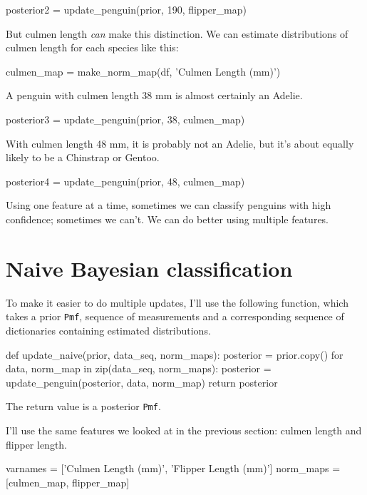 \documentclass[12pt]{book}
\theoremstyle{exercise}
\newcommand{\py}[1]{{\tt #1}}%
\begin{document}
\begin{code}
posterior2 = update_penguin(prior, 190, flipper_map)
\end{code}

But culmen length \emph{can} make this distinction. We can estimate
distributions of culmen length for each species like this:

\begin{code}
culmen_map = make_norm_map(df, 'Culmen Length (mm)')
\end{code}

A penguin with culmen length 38 mm is almost certainly an Adelie.

\begin{code}
posterior3 = update_penguin(prior, 38, culmen_map)
\end{code}

With culmen length 48 mm, it is probably not an Adelie, but it's about
equally likely to be a Chinstrap or Gentoo.

\begin{code}
posterior4 = update_penguin(prior, 48, culmen_map)
\end{code}

Using one feature at a time, sometimes we can classify penguins with
high confidence; sometimes we can't. We can do better using multiple
features.

\section{Naive Bayesian classification}
\label{naive-bayesian-classification}

To make it easier to do multiple updates, I'll use the following
function, which takes a prior \py{Pmf}, sequence of
measurements and a corresponding sequence of dictionaries containing
estimated distributions.

\begin{code}
def update_naive(prior, data_seq, norm_maps):
    posterior = prior.copy()
    for data, norm_map in zip(data_seq, norm_maps):
        posterior = update_penguin(posterior, data, norm_map)
    return posterior
\end{code}

The return value is a posterior \py{Pmf}.

I'll use the same features we looked at in the previous section: culmen
length and flipper length.

\begin{code}
varnames = ['Culmen Length (mm)', 'Flipper Length (mm)']
norm_maps = [culmen_map, flipper_map]
\end{code}
\end{document}
